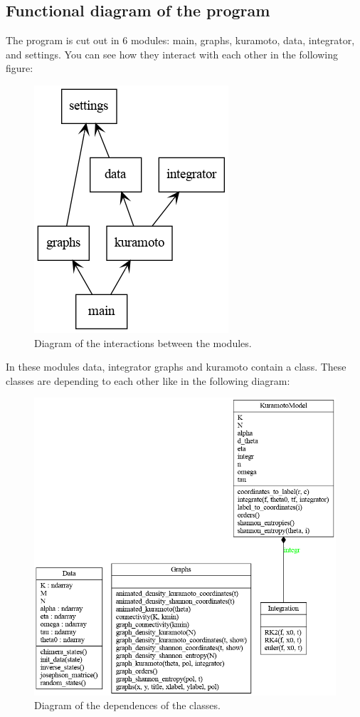 \documentclass[1pt, a4paper]{article}
\begin{document}
\newpage
\subsection{Functional diagram of the program}
\label{subs:2.4}
The program is cut out in 6 modules: main, graphs, kuramoto, data, integrator, and settings. You can see how they interact with each other in the following figure:
\begin{figure}[htbp]
    \centering
    \includegraphics[scale=0.6]{figures/packages_kuramotoModel.png}
    \caption{Diagram of the interactions between the modules.}
    \label{fig:diagram_module}
\end{figure}
In these modules data, integrator graphs and kuramoto contain a class. These classes are depending to each other like in the following diagram:
\begin{figure}[htbp]
    \centering
    \includegraphics[scale=0.5]{figures/classes_kuramotoModel.png}
    \caption{Diagram of the dependences of the classes.}
    \label{fig:diagram_classes}
\end{figure}

\newpage


\end{document}
